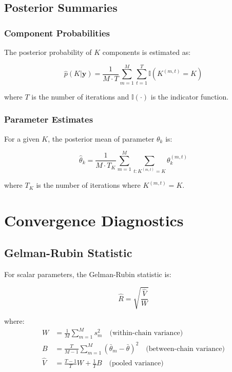 \documentclass[12pt]{article}
\begin{document}
\subsection{Posterior Summaries}

\subsubsection{Component Probabilities}

The posterior probability of $K$ components is estimated as:

\begin{equation}
\hat{p}(K|\mathbf{y}) = \frac{1}{M \cdot T} \sum_{m=1}^M \sum_{t=1}^T \mathbb{I}(K^{(m,t)} = K)
\end{equation}

where $T$ is the number of iterations and $\mathbb{I}(\cdot)$ is the indicator function.

\subsubsection{Parameter Estimates}

For a given $K$, the posterior mean of parameter $\theta_k$ is:

\begin{equation}
\hat{\theta}_k = \frac{1}{M \cdot T_K} \sum_{m=1}^M \sum_{t: K^{(m,t)} = K} \theta_k^{(m,t)}
\end{equation}

where $T_K$ is the number of iterations where $K^{(m,t)} = K$.

\section{Convergence Diagnostics}

\subsection{Gelman-Rubin Statistic}

For scalar parameters, the Gelman-Rubin statistic is:

\begin{equation}
\hat{R} = \sqrt{\frac{\hat{V}}{W}}
\end{equation}

where:
\begin{align}
W &= \frac{1}{M} \sum_{m=1}^M s_m^2 \quad \text{(within-chain variance)} \\
B &= \frac{T}{M-1} \sum_{m=1}^M (\bar{\theta}_m - \bar{\theta})^2 \quad \text{(between-chain variance)} \\
\hat{V} &= \frac{T-1}{T} W + \frac{1}{T} B \quad \text{(pooled variance)}
\end{align}
\end{document}

